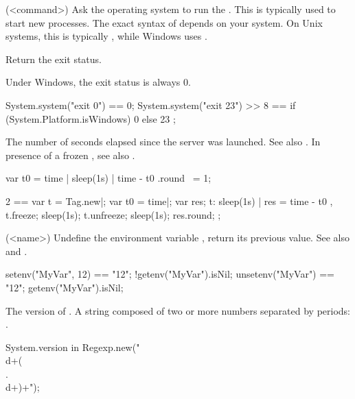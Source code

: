 \begin{urbiscriptapi}


\item[system](<command>)%
  Ask the operating system to run the .  This is typically used
  to start new processes.  The exact syntax of  depends on your
  system.  On Unix systems, this is typically , while Windows
  uses .

  Return the exit status.

  \begin{windows}
    Under Windows, the exit status is always 0.
  \end{windows}

\begin{urbiassert}
System.system("exit 0") == 0;
System.system("exit 23") >> 8
       == { if (System.Platform.isWindows) 0 else 23 };
\end{urbiassert}


\item[time] The number of seconds elapsed since the \urbi server was
  launched.  See also .  In presence of a frozen
  , see also .
\begin{urbiassert}
{ var t0 = time | sleep(1s) | time - t0 }.round ~= 1;

  2 ==
  {
    var t = Tag.new|;
    var t0 = time|;
    var res;
    t: { sleep(1s) | res = time - t0 },
    t.freeze;
    sleep(1s);
    t.unfreeze;
    sleep(1s);
    res.round;
  };
\end{urbiassert}


\item[unsetenv](<name>)%
  Undefine the environment variable , return its previous value.
  See also  and .

\begin{urbiassert}
setenv("MyVar", 12) == "12";
!getenv("MyVar").isNil;
unsetenv("MyVar") == "12";
getenv("MyVar").isNil;
\end{urbiassert}


\item[version]%
  The version of \usdk.  A string composed of two or more numbers separated
  by periods: .
\begin{urbiassert}
System.version in Regexp.new("\\d+(\\.\\d+)+");
\end{urbiassert}
\end{urbiscriptapi}

